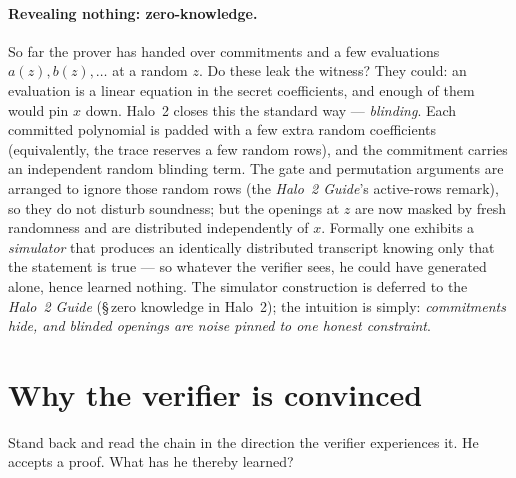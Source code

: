 \documentclass[11pt,a4paper]{article}
\theoremstyle{definition}
\begin{document}
\paragraph{Revealing nothing: zero-knowledge.} So far the prover has handed
over commitments and a few evaluations $a(z), b(z), \dots$ at a random $z$. Do
these leak the witness? They could: an evaluation is a linear equation in the
secret coefficients, and enough of them would pin $x$ down. Halo~2 closes this
the standard way --- \emph{blinding}. Each committed polynomial is padded with
a few extra random coefficients (equivalently, the trace reserves a few random
rows), and the commitment carries an independent random blinding term. The
gate and permutation arguments are arranged to ignore those random rows
(the \emph{Halo~2 Guide}'s active-rows remark), so they do not disturb
soundness; but the openings at $z$ are now masked by fresh randomness and are
distributed independently of $x$. Formally one exhibits a \emph{simulator} that
produces an identically distributed transcript knowing only that the statement
is true --- so whatever the verifier sees, he could have generated alone,
hence learned nothing. The simulator construction is deferred to the
\emph{Halo~2 Guide} (\S\,zero knowledge in Halo~2); the intuition is simply:
\emph{commitments hide, and blinded openings are noise pinned to one honest
constraint}.

\section{Why the verifier is convinced}\label{sec:assemble}

Stand back and read the chain in the direction the verifier experiences it. He
accepts a proof. What has he thereby learned?
\end{document}
